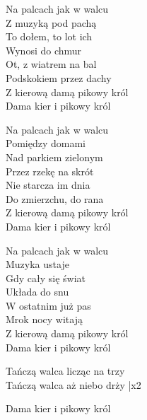 \begin{text}
    \hfill\break
Na palcach jak w walcu\\
Z muzyką pod pachą\\
To dołem, to lot ich\\
Wynosi do chmur\\
Ot, z wiatrem na bal\\
Podskokiem przez dachy\\
Z kierową damą pikowy król\\
Dama kier i pikowy król

Na palcach jak w walcu\\
Pomiędzy domami\\
Nad parkiem zielonym\\
Przez rzekę na skrót\\
Nie starcza im dnia\\
Do zmierzchu, do rana\\
Z kierową damą pikowy król\\
Dama kier i pikowy król

Na palcach jak w walcu\\
Muzyka ustaje\\
Gdy cały się świat\\
Układa do snu\\
W ostatnim już pas\\
Mrok nocy witają\\
Z kierową damą pikowy król\\
Dama kier i pikowy król

Tańczą walca licząc na trzy\\
Tańczą walca aż niebo drży |x2

Dama kier i pikowy król
\end{text}

